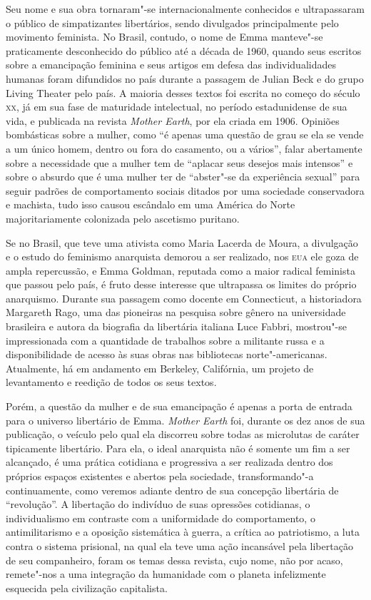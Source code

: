 Seu nome e sua obra tornaram"-se internacionalmente conhecidos e
ultrapassaram o público de simpatizantes libertários, sendo divulgados
principalmente pelo movimento feminista. No Brasil, contudo, o nome de
Emma manteve"-se praticamente desconhecido do público até a década de
1960, quando seus escritos sobre a emancipação feminina e seus artigos
em defesa das individualidades humanas foram difundidos no país durante
a passagem de Julian Beck e do grupo Living Theater pelo país. A 
maioria desses textos foi escrita no começo do século \textsc{xx}, já em sua
fase de maturidade intelectual, no período estadunidense de sua vida, e
publicada na revista \textit{Mother Earth}, por ela criada em 1906. Opiniões
bombásticas sobre a mulher, como “é apenas uma questão de grau se ela se
vende a um único homem, dentro ou fora do casamento, ou a vários”, 
falar abertamente sobre a necessidade que a mulher tem de “aplacar
seus desejos mais intensos” e sobre o absurdo que é uma mulher ter de
“abster"-se da experiência sexual” para seguir padrões de
comportamento sociais ditados por uma sociedade conservadora e
machista, tudo isso causou escândalo em uma América do Norte majoritariamente
colonizada pelo ascetismo puritano.

Se no Brasil, que teve uma ativista como Maria Lacerda de Moura, a 
divulgação e o estudo do feminismo anarquista demorou a ser realizado,
nos \textsc{eua} ele goza de ampla repercussão, e Emma Goldman, reputada como a
maior radical feminista que passou pelo país, é fruto desse interesse
que ultrapassa os limites do próprio anarquismo. Durante sua passagem
como docente em Connecticut, a historiadora Margareth Rago, uma das
pioneiras na pesquisa sobre gênero na universidade brasileira e autora
da biografia da libertária italiana Luce Fabbri, mostrou"-se
impressionada com a quantidade de trabalhos sobre a militante russa e a
disponibilidade de acesso às suas obras nas bibliotecas
norte"-americanas. Atualmente, há em andamento em
Berkeley, Califórnia, um projeto de levantamento e reedição de todos os seus
textos. 

Porém, a questão da mulher e de sua emancipação é apenas a porta de
entrada para o universo libertário de Emma. \textit{Mother Earth} foi, durante
os dez anos de sua publicação, o veículo pelo qual ela discorreu sobre
todas as microlutas de caráter tipicamente libertário. Para ela, o
ideal anarquista não é somente um fim a ser alcançado, é uma prática
cotidiana e progressiva a ser realizada dentro dos próprios espaços
existentes e abertos pela sociedade, transformando"-a continuamente,
como veremos adiante dentro de sua concepção libertária de “revolução”.
A libertação do indivíduo de suas opressões cotidianas, o
individualismo em contraste com a uniformidade do comportamento, o
antimilitarismo e a oposição sistemática à guerra, a crítica ao
patriotismo, a luta contra o sistema prisional, na qual ela teve uma
ação incansável pela libertação de seu companheiro, foram os temas
dessa revista, cujo nome, não por acaso, remete"-nos a uma integração
da humanidade com o planeta infelizmente esquecida pela civilização
capitalista.

